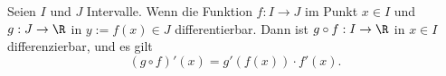 Seien $I$ und $J$ Intervalle. Wenn die Funktion $f: I \to J$ im Punkt $x \in I$ und $g: J \to \R$ in $y := f(x) \in J$ differentierbar. Dann ist $g \circ f: I \to \R$ in $x \in I$ differenzierbar, und es gilt
$$(g \circ f)'(x) = g'(f(x)) \cdot f'(x).$$